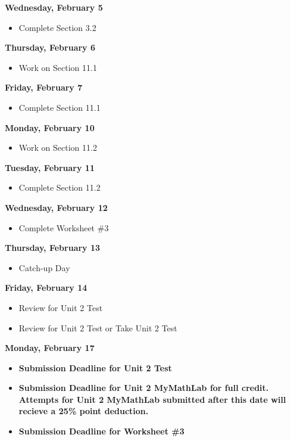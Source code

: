 \documentclass[11pt]{article}
\begin{document}
\textbf{Wednesday, February 5}

\begin{itemize}
\item Complete Section 3.2
\end{itemize}

\textbf{Thursday, February 6}

\begin{itemize}
\item Work on Section 11.1
\end{itemize}

\textbf{Friday, February 7}

\begin{itemize}
\item Complete Section 11.1
\end{itemize}

\textbf{Monday, February 10}

\begin{itemize}
\item Work on Section 11.2
\end{itemize}

\textbf{Tuesday, February 11}

\begin{itemize}
\item Complete Section 11.2
\end{itemize}

\textbf{Wednesday, February 12}

\begin{itemize}
\item Complete Worksheet \#3
\end{itemize}

\textbf{Thursday, February 13}

\begin{itemize}
\item Catch-up Day
\end{itemize}

\textbf{Friday, February 14}

\begin{itemize}
\item Review for Unit 2 Test
\item Review for Unit 2 Test or Take Unit 2 Test
\end{itemize}

\textbf{Monday, February 17}

\begin{itemize}
\item \textbf{Submission Deadline for Unit 2 Test}
\item \textbf{Submission Deadline for Unit 2 MyMathLab for full credit. Attempts for Unit 2 MyMathLab submitted after this date will recieve a 25\% point deduction.}
\item \textbf{Submission Deadline for Worksheet \#3}
\end{itemize}
\end{document}
